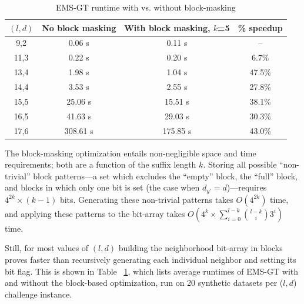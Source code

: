 \documentclass[conference]{IEEEtran}
\begin{document}
\begin{enumerate}[label={\em \arabic*.}]
			\begin{table}[h] %
				\renewcommand{\arraystretch}{1.3}
				\caption{EMS-GT runtime with vs. without block-masking}
				\label{tbl:speedup_blockmasking}
				\centering
				\begin{tabular}{|c|c|c|c|}
				\hline 
				\bfseries\boldmath $(l,d)$ & \bfseries No block masking & \bfseries\boldmath With block masking, $k$=5 & \bfseries \% speedup\\
				\hline
				 9,2 &   0.06 s &    0.11 s &     --  \\
				11,3 &   0.22 s &    0.20 s &    6.7\%\\
				13,4 &   1.98 s &    1.04 s &   47.5\%\\
				14,4 &   3.53 s &    2.55 s &   27.8\%\\
				15,5 &  25.06 s &   15.51 s &   38.1\%\\
				16,5 &  41.63 s &   29.03 s &   30.3\%\\
				17,6 & 308.61 s &  175.85 s &   43.0\%\\
				\hline\end{tabular}
				\end{table}	

			
			The block-masking optimization entails non-negligible space and time requirements; both are a function of the suffix length $k$. Storing all possible ``non-trivial'' block patterns---a set which excludes the ``empty'' block, the ``full'' block, and blocks in which only one bit is set (the case when $d_{y'} = d$)---requires $4^{2k}\times (k-1)$ bits. Generating these non-trivial patterns takes $O(4^{2k})$ time, and applying these patterns to the bit-array takes $O(4^{k} \times \sum_{i=0}^{l-k} \binom{l-k}{i} 3^{i})$ time. \newline

			Still, for most values of $(l,d)$ building the neighborhood bit-array in blocks proves faster than recursively generating each individual neighbor and setting its bit flag. This is shown in Table ~\ref{tbl:speedup_blockmasking}, which lists average runtimes of EMS-GT with and without the block-based optimization, run on 20 synthetic datasets per ($l,d$) challenge instance.
			\end{enumerate}	

\end{document}
